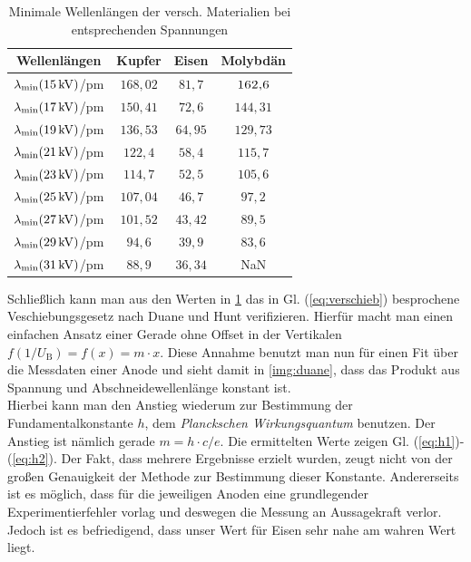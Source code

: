 \documentclass[numbers=noenddot,12pt,a4paper]{scrartcl}
\newcommand{\ix}[1]{_\text{#1}}
\newcommand{\tilt}[1]{\textit{#1}}
\begin{document}
\begin{table}[H]
	\centering
	\begin{tabular}{c|c|c|c}
		Wellenlängen &  Kupfer & Eisen & Molybdän \\ \hline
		$\lambda\ix{min}(\unit[15]{kV})$/pm & $168,02$ & $81,7$ & $\textsc{162,6}$\\ \hline
		$\lambda\ix{min}(\unit[17]{kV})$/pm & $150,41$ & $72,6$ & $144,31$ \\ \hline
		$\lambda\ix{min}(\unit[19]{kV})$/pm & $136,53$ & $64,95$ & $129,73$ \\ \hline
		$\lambda\ix{min}(\unit[21]{kV})$/pm & $122,4$ & $58,4$ & $115,7$ \\ \hline
		$\lambda\ix{min}(\unit[23]{kV})$/pm & $114,7$ & $52,5$ & $105,6$ \\ \hline
		$\lambda\ix{min}(\unit[25]{kV})$/pm & $107,04$ & $46,7$ & $97,2$\\ \hline
		$\lambda\ix{min}(\unit[27]{kV})$/pm & $101,52$ & $43,42$ & $89,5$\\ \hline
		$\lambda\ix{min}(\unit[29]{kV})$/pm & $94,6$ & $39,9$ & $83,6$ \\ \hline
		$\lambda\ix{min}(\unit[31]{kV})$/pm & $88,9$ & $36,34$ & NaN\\ \hline
	\end{tabular}
	\caption{Minimale Wellenlängen der versch. Materialien bei entsprechenden Spannungen}\label{tab:min}
\end{table}
Schließlich kann man aus den Werten in \ref{tab:min} das in Gl. (\ref{eq:verschieb}) besprochene Veschiebungsgesetz nach Duane und Hunt verifizieren. Hierfür macht man einen einfachen Ansatz einer Gerade ohne Offset in der Vertikalen $f(1/U\ix{B})=f(x)=m\cdot x$. Diese Annahme benutzt man nun für einen Fit über die Messdaten einer Anode und sieht damit in \ref{img:duane}, dass das Produkt aus Spannung und Abschneidewellenlänge konstant ist. \\
Hierbei kann man den Anstieg wiederum zur Bestimmung der Fundamentalkonstante $h$, dem \tilt{Planckschen Wirkungsquantum} benutzen. Der Anstieg ist nämlich gerade $m=h\cdot c/e$. Die ermittelten Werte zeigen Gl. (\ref{eq:h1})-(\ref{eq:h2}). Der Fakt, dass mehrere Ergebnisse erzielt wurden, zeugt nicht von der großen Genauigkeit der Methode zur Bestimmung dieser Konstante. Andererseits ist es möglich, dass für die jeweiligen Anoden eine grundlegender Experimentierfehler vorlag und deswegen die Messung an Aussagekraft verlor. Jedoch ist es befriedigend, dass unser Wert für Eisen sehr nahe am wahren Wert liegt.
\end{document}
